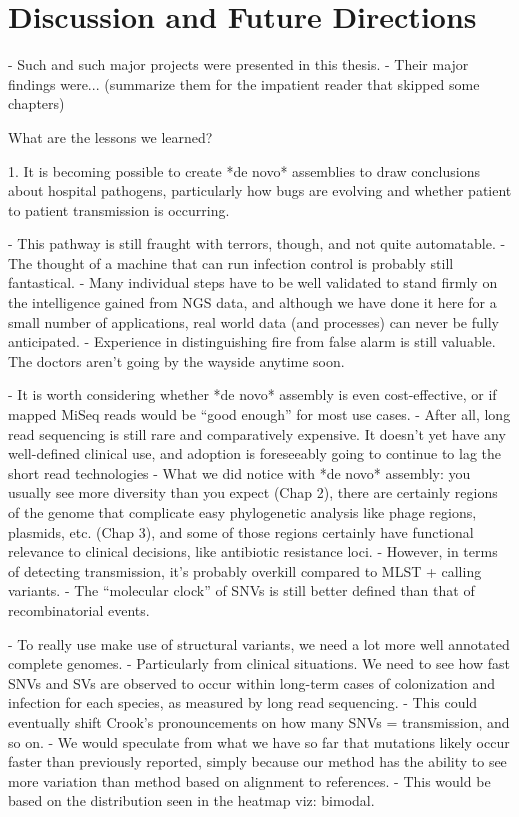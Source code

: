
\chapter{Discussion and Future Directions}
\label{chap:discussion}

- Such and such major projects were presented in this thesis.
- Their major findings were... (summarize them for the impatient reader that skipped some chapters)

What are the lessons we learned?

1. It is becoming possible to create *de novo* assemblies to draw conclusions about hospital pathogens, particularly how bugs are evolving and whether patient to patient transmission is occurring.

- This pathway is still fraught with terrors, though, and not quite automatable.
  - The thought of a machine that can run infection control is probably still fantastical.
  - Many individual steps have to be well validated to stand firmly on the intelligence gained from NGS data, and although we have done it here for a small number of applications, real world data (and processes) can never be fully anticipated.
  - Experience in distinguishing fire from false alarm is still valuable. The doctors aren't going by the wayside anytime soon.

- It is worth considering whether *de novo* assembly is even cost-effective, or if mapped MiSeq reads would be ``good enough'' for most use cases.
  - After all, long read sequencing is still rare and comparatively expensive. It doesn't yet have any well-defined clinical use, and adoption is foreseeably going to continue to lag the short read technologies
  - What we did notice with *de novo* assembly: you usually see more diversity than you expect (Chap 2), there are certainly regions of the genome that complicate easy phylogenetic analysis like phage regions, plasmids, etc. (Chap 3), and some of those regions certainly have functional relevance to clinical decisions, like antibiotic resistance loci. 
  - However, in terms of detecting transmission, it's probably overkill compared to MLST + calling variants.
  - The ``molecular clock'' of SNVs is still better defined than that of recombinatorial events.

- To really use make use of structural variants, we need a lot more well annotated complete genomes.
  - Particularly from clinical situations. We need to see how fast SNVs and SVs are observed to occur within long-term cases of colonization and infection for each species, as measured by long read sequencing.
  - This could eventually shift Crook's pronouncements on how many SNVs = transmission, and so on.
  - We would speculate from what we have so far that mutations likely occur faster than previously reported, simply because our method has the ability to see more variation than method based on alignment to references.
  - This would be based on the distribution seen in the heatmap viz: bimodal.
  
